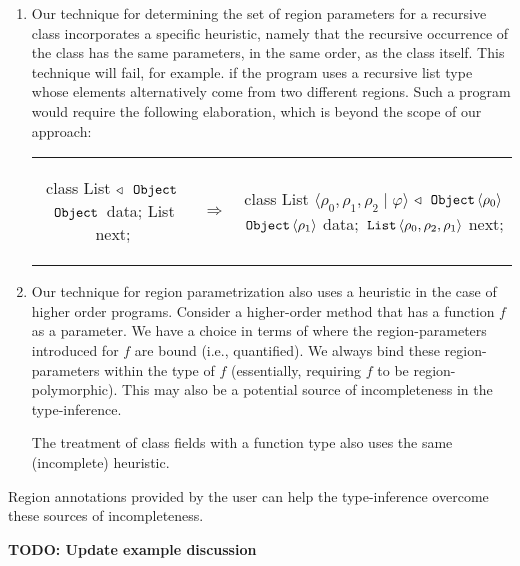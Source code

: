 \begin{enumerate}
\item Our technique for determining the set of region parameters for a recursive class
incorporates a specific heuristic, namely that the recursive occurrence of the class has
the same parameters, in the same order, as the class itself. This technique will fail, for
example. if the program uses a recursive list type whose elements alternatively come
from two different regions. Such a program would require the following elaboration,
which is beyond the scope of our approach:
\begin{tabular}{ccc}
\begin{minipage}{0.3\linewidth}
\begin{codejava}
class List
  $\triangleleft$ $\,{\tt Object}\,$
{
  $\,{\tt Object}\,$ data;
  List next;
}
\end{codejava}
\end{minipage}
&
$\Rightarrow$
&
\begin{minipage}{0.5\linewidth}
\begin{codejava}
class List $\langle \rho_0, \rho_1, \rho_2 \; | \; \varphi \rangle$
  $\triangleleft$ $\,{\tt Object}\, \langle \rho_0 \rangle$
{
  $\,{\tt Object}\, \langle \rho_1 \rangle$ data;
  $\,{\tt List}\, \langle \rho_0, \rho_2, \rho_1 \rangle$ next;
}
\end{codejava}
\end{minipage}
\end{tabular}

\item Our technique for region parametrization also uses a heuristic in the case of
higher order programs. Consider a higher-order method that has a function $f$ as a
parameter. We have a choice in terms of where the region-parameters introduced for
$f$ are bound (i.e., quantified). We always bind these region-parameters within the type
of $f$ (essentially, requiring $f$ to be region-polymorphic). This may also be a potential
source of incompleteness in the type-inference.

The treatment of class fields with a function type also uses the same (incomplete)
heuristic.

\end{enumerate}

Region annotations provided by the user can help the type-inference overcome these
sources of incompleteness.

\textbf{TODO: Update example discussion}

